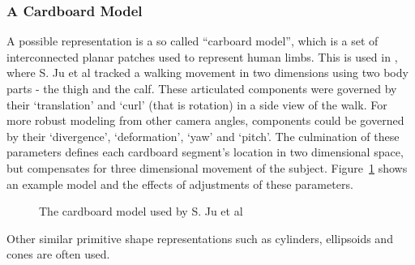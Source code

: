 \subsubsection{A Cardboard Model}

A possible representation is a so called ``carboard model'', which is a set of interconnected planar patches used to represent human limbs. This is used in \cite{cardboardpeople}, where S. Ju et al tracked a walking movement in two dimensions using two body parts - the thigh and the calf. These articulated components were governed by their `translation' and `curl' (that is rotation) in a side view of the walk. For more robust modeling from other camera angles, components could be governed by their `divergence', `deformation', `yaw' and `pitch'. The culmination of these parameters defines each cardboard segment's location in two dimensional space, but compensates for three dimensional movement of the subject. Figure~\ref{fig:cardboardmodel} shows an example model and the effects of adjustments of these parameters.

\begin{figure}[H]
    \centering
\caption{The cardboard model used by S. Ju et al\cite{cardboardpeople}}
\label{fig:cardboardmodel}
\end{figure}

Other similar primitive shape representations such as cylinders, ellipsoids and cones are often used\cite{cvmocapsurvey}.